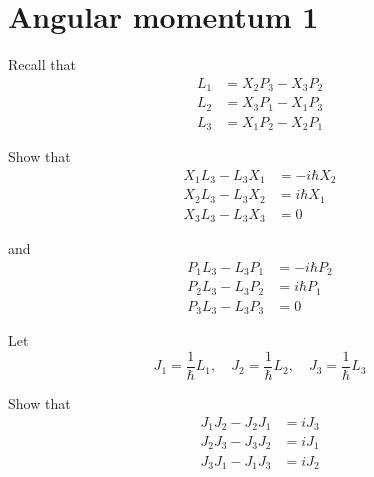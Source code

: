 

\section*{Angular momentum 1}

Recall that
\begin{align*}
L_1&=X_2P_3-X_3P_2
\\
L_2&=X_3P_1-X_1P_3
\\
L_3&=X_1P_2-X_2P_1
\end{align*}

Show that
\begin{align*}
X_1L_3-L_3X_1&=-i\hbar X_2
\\
X_2L_3-L_3X_2&=i\hbar X_1
\\
X_3L_3-L_3X_3&=0
\end{align*}

and
\begin{align*}
P_1L_3-L_3P_1&=-i\hbar P_2
\\
P_2L_3-L_3P_2&=i\hbar P_1
\\
P_3L_3-L_3P_3&=0
\end{align*}

Let
\begin{equation*}
J_1=\frac{1}{\hbar}L_1,\quad J_2=\frac{1}{\hbar}L_2,\quad J_3=\frac{1}{\hbar}L_3
\end{equation*}

Show that
\begin{align*}
J_1J_2-J_2J_1&=iJ_3
\\
J_2J_3-J_3J_2&=iJ_1
\\
J_3J_1-J_1J_3&=iJ_2
\end{align*}


